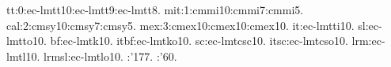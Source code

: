 \newfont tt:0:ec-lmtt10:ec-lmtt9:ec-lmtt8.
\newmathfont mit:1:cmmi10:cmmi7:cmmi5.
\newmathfont cal:2:cmsy10:cmsy7:cmsy5.
\newmathfont mex:3:cmex10:cmex10:cmex10.
\newtextfont it:ec-lmtti10.
\newtextfont sl:ec-lmtto10.
\newtextfont bf:ec-lmtk10.
\newtextfont itbf:ec-lmtko10.
\newtextfont sc:ec-lmtcsc10.
\newtextfont itsc:ec-lmtcso10.
\newtextfont lrm:ec-lmtl10.
\newtextfont lrmsl:ec-lmtlo10.
:'177.
:'60.
\tt
